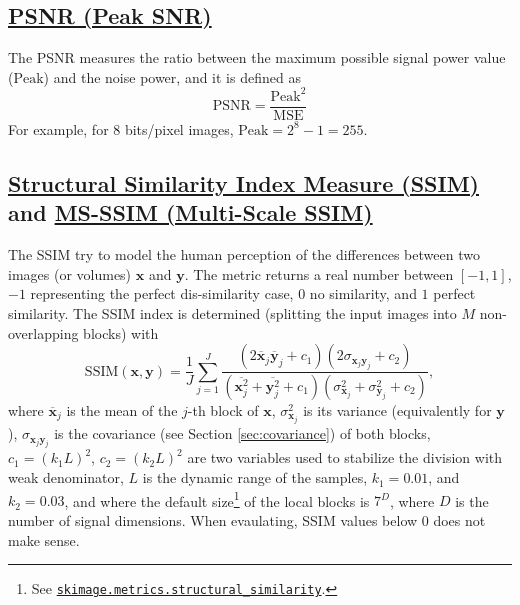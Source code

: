 \documentclass{article}
\begin{document}
\subsection{\href{https://en.wikipedia.org/wiki/Peak_signal-to-noise_ratio}{PSNR (Peak SNR)}}

The PSNR measures the ratio between the maximum possible signal power
value ($\text{Peak}$) and the noise power, and it is defined as
\begin{equation}
  \text{PSNR} = \frac{\text{Peak}^2}{\text{MSE}}
  \label{eq:PSNR}
\end{equation}
For example, for 8 bits/pixel images, $\text{Peak}=2^8-1=255$.


\subsection{\href{https://en.wikipedia.org/wiki/Structural_similarity_index_measure}{Structural
    Similarity Index Measure (SSIM)} and
  \href{https://en.wikipedia.org/wiki/Structural_similarity_index_measure\#Multi-scale_SSIM}{MS-SSIM
    (Multi-Scale SSIM)}}

The SSIM \cite{wang2004image} try to model the human perception of the
differences between two images (or volumes) $\mathbf{x}$ and
$\mathbf{y}$. The metric returns a real number between $[-1, 1]$, $-1$
representing the perfect dis-similarity case, $0$ no similarity, and
$1$ perfect similarity. The SSIM index is determined (splitting the
input images into $M$ non-overlapping blocks) with
\begin{equation}
  \text{SSIM}(\mathbf{x}, \mathbf{y}) = \frac{1}{J} \sum_{j=1}^J \frac{(2\overline{\mathbf{x}}_j \overline{\mathbf{y}}_j + c_1)(2\sigma_{\mathbf{x}_j \mathbf{y}_j} + c_2)}{(\overline{\mathbf{x}_j^2} + \overline{\mathbf{y}_j^2} + c_1)(\sigma^2_{\mathbf{x}_j} + \sigma^2_{\mathbf{y}_j} + c_2)},
\end{equation}
where $\overline{\mathbf x}_j$ is the mean of the $j$-th block of
$\mathbf{x}$, $\sigma^2_{\mathbf{x}_j}$ is its variance (equivalently
for $\mathbf{y}$), $\sigma_{\mathbf{x}_j\mathbf{y}_j}$ is the
covariance (see Section \ref{sec:covariance}) of both blocks,
$c_1=(k_1L)^2$, $c_2=(k_2L)^2$ are two variables used to stabilize the
division with weak denominator, $L$ is the dynamic range of the
samples, $k_1=0.01$, and $k_2=0.03$, and where the default
size\footnote{See
  \href{https://scikit-image.org/docs/stable/api/skimage.metrics.html\#skimage.metrics.structural_similarity}{\texttt{skimage.metrics.structural\_similarity}}.}
of the local blocks is $7^D$, where $D$ is the number of signal
dimensions. When evaulating, SSIM values below $0$ does not make
sense.
\end{document}
